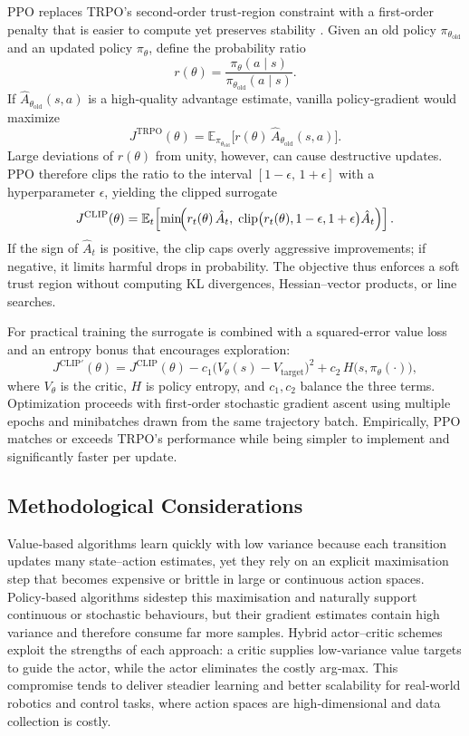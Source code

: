 \ac{PPO} replaces \ac{TRPO}'s second‑order trust‑region constraint with a first‑order penalty that is easier to compute yet preserves stability \cite{PPO2017}.  Given an old policy $\pi_{\theta_{\text{old}}}$ and an updated policy $\pi_\theta$, define the probability ratio
$$
r(\theta)=\frac{\pi_\theta(a\mid s)}{\pi_{\theta_{\text{old}}}(a\mid s)}.
$$
If $\hat{A}_{\theta_{\text{old}}}(s,a)$ is a high‑quality advantage estimate, vanilla policy‑gradient would maximize
$$
J^{\text{TRPO}}(\theta)=\mathbb{E}_{\pi_{\theta_{\text{old}}}}\bigl[r(\theta)\,\hat{A}_{\theta_{\text{old}}}(s,a)\bigr].
$$
Large deviations of $r(\theta)$ from unity, however, can cause destructive updates.  \ac{PPO} therefore clips the ratio to the interval $[1-\epsilon,\,1+\epsilon]$ with a hyperparameter $\epsilon$, yielding the clipped surrogate
$$
J^{\mathrm{CLIP}}(\theta)=\mathbb{E}_t\!\left[\min\!\Bigl(r_t(\theta)\,\hat{A}_t,\;
\operatorname{clip}\bigl(r_t(\theta),1-\epsilon,1+\epsilon\bigr)\hat{A}_t\Bigr)\right].
$$
If the sign of $\hat{A}_t$ is positive, the clip caps overly aggressive improvements; if negative, it limits harmful drops in probability.  The objective thus enforces a soft trust region without computing \ac{KL} divergences, Hessian–vector products, or line searches.

For practical training the surrogate is combined with a squared‑error value loss and an entropy bonus that encourages exploration:
$$
J^{\mathrm{CLIP}'}(\theta)=
J^{\mathrm{CLIP}}(\theta)
-c_1\bigl(V_\theta(s)-V_{\text{target}}\bigr)^{2}
+c_2\,H\!\bigl(s,\pi_\theta(\cdot)\bigr),
$$
where $V_\theta$ is the critic, $H$ is policy entropy, and $c_1, c_2$ balance the three terms.  Optimization proceeds with first‑order stochastic gradient ascent using multiple epochs and minibatches drawn from the same trajectory batch.  Empirically, \ac{PPO} matches or exceeds \ac{TRPO}'s performance while being simpler to implement and significantly faster per update.

\subsection{Methodological Considerations}

Value‑based algorithms learn quickly with low variance because each transition updates many state–action estimates, yet they rely on an explicit maximisation step that becomes expensive or brittle in large or continuous action spaces. Policy‑based algorithms sidestep this maximisation and naturally support continuous or stochastic behaviours, but their gradient estimates contain high variance and therefore consume far more samples. Hybrid actor–critic schemes exploit the strengths of each approach: a critic supplies low‑variance value targets to guide the actor, while the actor eliminates the costly arg‑max. This compromise tends to deliver steadier learning and better scalability for real‑world robotics and control tasks, where action spaces are high‑dimensional and data collection is costly.

